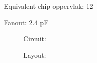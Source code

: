 Equivalent chip oppervlak: 12

Fanout: 2.4 pF

\begin{figure}[bth]
Circuit:\\

\end{figure}



\begin{figure}[bth]
Layout:\\

\end{figure}


\clearpage


